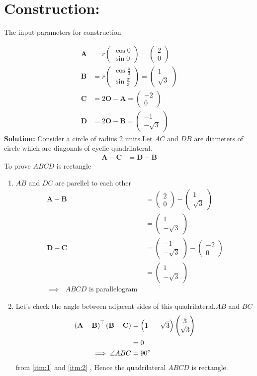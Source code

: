 \documentclass[10pt]{article}
\providecommand{\brak}[1]{\ensuremath{\left(#1\right)}}
\newcommand{\solution}{\noindent \textbf{Solution: }}
\newcommand{\myvec}[1]{\ensuremath{\begin{pmatrix}#1\end{pmatrix}}}
\let\vec\mathbf{}
\begin{document}
\section*{\large Construction:}
The input parameters for construction
\begin{table}[h!]
	\small
	\centering
     
	\label{table:1}
\end{table}
\begin{align}
	\vec{A}&=r\myvec{\cos0\\ \sin0}=\myvec{2\\0}\\
	\vec{B}&=r\myvec{\cos\frac{\pi}{3}\\ \sin\frac{\pi}{3}}=\myvec{1\\\sqrt{3}}\\
	\vec{C}&=2\vec{O}-\vec{A}=\myvec{-2\\0}\\
	\vec{D}&=2\vec{O}-\vec{B}=\myvec{-1\\-\sqrt{3}}
\end{align}
\solution
Consider a circle of radius 2 units.Let $AC$ and $DB$ are diameters of circle which are diagonals of cyclic quadrilateral.
\begin{align}
	\vec{A}-\vec{C} &= \vec{D}-\vec{B}
\end{align}
To prove $ABCD$ is rectangle
\begin{enumerate}[ref=(\roman*)]
\item \label{itm:1} $AB$ and $DC$ are parellel to each other
\begin{align}
	\vec{A}-\vec{B} &= \myvec{2\\0} - \myvec{1\\\sqrt{3}}\\
	&=\myvec{1\\-\sqrt{3}}\\
	\vec{D}-\vec{C} &= \myvec{-1\\-\sqrt{3}} - \myvec{-2\\0}\\
	&=\myvec{1\\-\sqrt{3}}\\
	\implies \text{ $ABCD$ is parallelogram }
\end{align}
\item \label{itm:2} Let's check the angle between adjacent sides of this quadrilateral,$AB$ and $BC$
\begin{align}
	\brak{\vec{A}-\vec{B}}^{\top}\brak{\vec{B}-\vec{C}} &=\myvec{1 & -\sqrt{3}}\myvec{3\\\sqrt{3}}\\	
	&= 0\\
	\implies \angle ABC &= 90\degree
\end{align}
from \ref{itm:1} and \ref{itm:2} , Hence the quadrilateral $ABCD$ is rectangle.
\end{enumerate}
\end{document}
